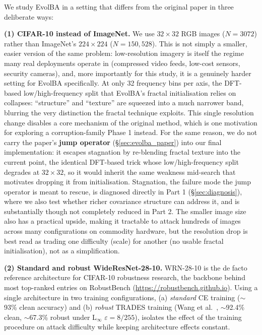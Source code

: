 \documentclass[11pt, a4paper]{article}
\begin{document}
We study EvolBA in a setting that differs from the original paper in three deliberate ways:

\textbf{(1) CIFAR-10 instead of ImageNet.} We use $32\times32$ RGB images ($N = 3072$) rather than ImageNet's $224\times224$ ($N = 150{,}528$). This is not simply a smaller, easier version of the same problem: low-resolution imagery is itself the regime many real deployments operate in (compressed video feeds, low-cost sensors, security cameras), and, more importantly for this study, it is a genuinely harder setting for EvolBA specifically. At only 32 frequency bins per axis, the DFT-based low/high-frequency split that EvolBA's fractal initialisation relies on collapses: ``structure'' and ``texture'' are squeezed into a much narrower band, blurring the very distinction the fractal technique exploits. This single resolution change disables a core mechanism of the original method, which is one motivation for exploring a corruption-family Phase 1 instead. For the same reason, we do not carry the paper's \textbf{jump operator} (\S\ref{sec:evolba_paper}) into our final implementation: it escapes stagnation by re-blending fractal texture into the current point, the identical DFT-based trick whose low/high-frequency split degrades at $32\times32$, so it would inherit the same weakness mid-search that motivates dropping it from initialisation. Stagnation, the failure mode the jump operator is meant to rescue, is diagnosed directly in Part 1 (\S\ref{sec:diagnosis}), where we also test whether richer covariance structure can address it, and is substantially though not completely reduced in Part 2. The smaller image size also has a practical upside, making it tractable to attack hundreds of images across many configurations on commodity hardware, but the resolution drop is best read as trading one difficulty (scale) for another (no usable fractal initialisation), not as a simplification.

\textbf{(2) Standard and robust WideResNet-28-10.} WRN-28-10 is the de facto reference architecture for CIFAR-10 robustness research, the backbone behind most top-ranked entries on RobustBench (\url{https://robustbench.github.io}). Using a single architecture in two training configurations, (a) \emph{standard} CE training ($\sim$93\% clean accuracy) and (b) \emph{robust} TRADES training (Wang et al.~\cite{wang2023}, $\sim$92.4\% clean, $\sim$67.3\% robust under L$_\infty$ $\varepsilon=8/255$), isolates the effect of the training procedure on attack difficulty while keeping architecture effects constant.
\end{document}

